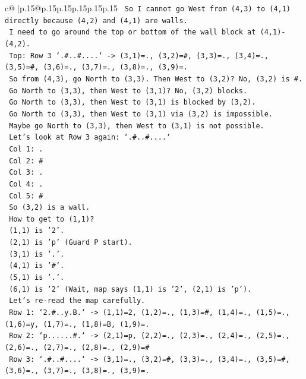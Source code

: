 \documentclass{article}
\begin{document}
{\begin{supertabular}{c@{$\;$}|p{.15\linewidth}@{}p{.15\linewidth}p{.15\linewidth}p{.15\linewidth}p{.15\linewidth}p{.15\linewidth}}
{{{\texttt{   So I cannot go West from (4,3) to (4,1) directly because (4,2) and (4,1) are walls.} \\
\texttt{   I need to go around the top or bottom of the wall block at (4,1){-}(4,2).} \\
\texttt{   Top: Row 3 `.\#..\#....` {-}> (3,1)=., (3,2)=\#, (3,3)=., (3,4)=., (3,5)=\#, (3,6)=., (3,7)=., (3,8)=., (3,9)=.} \\
\texttt{   So from (4,3), go North to (3,3). Then West to (3,2)? No, (3,2) is \#.} \\
\texttt{   Go North to (3,3), then West to (3,1)? No, (3,2) blocks.} \\
\texttt{   Go North to (3,3), then West to (3,1) is blocked by (3,2).} \\
\texttt{   Go North to (3,3), then West to (3,1) via (3,2) is impossible.} \\
\texttt{   Maybe go North to (3,3), then West to (3,1) is not possible.} \\
\texttt{   Let's look at Row 3 again: `.\#..\#....`} \\
\texttt{   Col 1: .} \\
\texttt{   Col 2: \#} \\
\texttt{   Col 3: .} \\
\texttt{   Col 4: .} \\
\texttt{   Col 5: \#} \\
\texttt{   So (3,2) is a wall.} \\
\texttt{   How to get to (1,1)?} \\
\texttt{   (1,1) is '2'.} \\
\texttt{   (2,1) is 'p' (Guard P start).} \\
\texttt{   (3,1) is '.'.} \\
\texttt{   (4,1) is '\#'.} \\
\texttt{   (5,1) is '.'.} \\
\texttt{   (6,1) is '2' (Wait, map says (1,1) is '2', (2,1) is 'p').} \\
\texttt{   Let's re{-}read the map carefully.} \\
\texttt{   Row 1: `2.\#..y.B.` {-}> (1,1)=2, (1,2)=., (1,3)=\#, (1,4)=., (1,5)=., (1,6)=y, (1,7)=., (1,8)=B, (1,9)=.} \\
\texttt{   Row 2: `p......\#.` {-}> (2,1)=p, (2,2)=., (2,3)=., (2,4)=., (2,5)=., (2,6)=., (2,7)=., (2,8)=., (2,9)=\#} \\
\texttt{   Row 3: `.\#..\#....` {-}> (3,1)=., (3,2)=\#, (3,3)=., (3,4)=., (3,5)=\#, (3,6)=., (3,7)=., (3,8)=., (3,9)=.} \\
}}}
\end{supertabular}}
\end{document}
